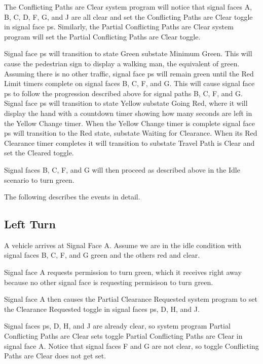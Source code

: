 \documentclass[letterpaper,twoside]{article}
\begin{document}
The Conflicting Paths are Clear system program will notice that
signal faces A, B, C, D, F, G, and J are all clear and set the
Conflicting Paths are Clear toggle in signal face ps.  Similarly,
the Partial Conflicting Paths are Clear system program will set the
Partial Conflicting Paths are Clear toggle.

Signal face ps will transition to state Green substate Minimum Green.
This will cause the pedestrian sign to display a walking man, the equivalent
of green.  Assuming there is no other traffic, signal face ps will remain green
until the Red Limit timers complete on signal faces B, C, F, and G.
This will cause signal face ps to follow the progression described above
for signal paths B, C, F, and G.  Signal face ps  will transition to state
Yellow
substate Going Red, where it will display the hand with a countdown timer
showing how many seconds are left in the Yellow Change timer.  When the Yellow
Change timer is complete signal face ps will transition to the Red state,
substate Waiting for Clearance.  When its Red Clearance timer completes it will
transition to substate Travel Path is Clear and set the Cleared toggle.

Signal faces B, C, F, and G will then proceed as described above
in the Idle scenario to turn green.

The following describes the events in detail.



\subsection{Left Turn}

A vehicle arrives at Signal Face A.  Assume we are in the idle condition
with signal faces B, C, F, and G green and the others red and clear.

Signal face A requests permission to turn green, which it receives right
away because no other signal face is requesting permisison to turn green.

Signal face A then causes the Partial Clearance Requested system program
to set the Clearance Requested toggle in signal faces ps, D, H, and J.

Signal faces ps, D, H, and J are already clear, so system program Partial
Conflicting Paths are Clear sets toggle Partial Conflicting Paths are Clear
in signal face A.
Notice that signal faces F and G are not clear, so toggle Conflicting Paths
are Clear does not get set.
\end{document}
